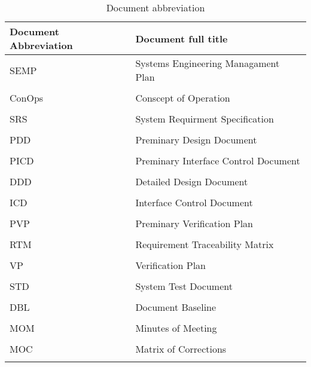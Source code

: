 \begin{table}[h]
	\centering
	\begin{tabular}{ll}
		\textbf{Document Abbreviation} & \textbf{Document full title} \\ \hline
		SEMP & Systems Engineering Managament Plan \\
		& \\
		ConOps & Conscept of Operation \\
		& \\
		SRS & System Requirment Specification \\
		& \\
		PDD & Preminary Design Document \\
		& \\
		PICD & Preminary Interface Control Document \\
		& \\
		DDD & Detailed Design Document \\
		& \\
		ICD & Interface Control Document \\
		& \\
		PVP & Preminary Verification Plan \\
		& \\
		RTM & Requirement Traceability Matrix \\
		& \\
		VP & Verification Plan \\
		& \\
		STD & System Test Document \\
		& \\
		DBL & Document Baseline \\
		& \\
		MOM & Minutes of Meeting \\
		& \\
		MOC & Matrix of Corrections \\
		& \\
	\end{tabular}
	\caption{Document abbreviation}
	\label{tab:names}
\end{table}
